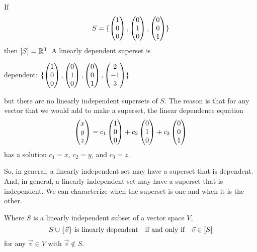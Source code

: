 \begin{example}
If
\begin{equation*}
   S =\mbox{$\{\begin{pmatrix} 1 \\ 0 \\ 0 \end{pmatrix},
          \begin{pmatrix} 0 \\ 1 \\ 0 \end{pmatrix},
          \begin{pmatrix} 0 \\ 0 \\ 1 \end{pmatrix}        \}$} 
\end{equation*}
then \( \relax [S\relax ]=\mathbb{R}^3 \).
A linearly dependent superset is 
\begin{center}
     dependent:
     \( \mbox{$\{
         \begin{pmatrix} 1 \\ 0 \\ 0 \end{pmatrix},
         \begin{pmatrix} 0 \\ 1 \\ 0 \end{pmatrix},
         \begin{pmatrix} 0 \\ 0 \\ 1 \end{pmatrix},
         \begin{pmatrix} 2 \\ -1 \\ 3 \end{pmatrix} \}$} \)     
\end{center}
but there are no linearly independent supersets of $S$.
The reason is that for any vector that we would add to make a
superset, the linear dependence equation
\begin{equation*}
  \begin{pmatrix} x \\ y \\ z \end{pmatrix}
  =c_1\begin{pmatrix} 1 \\ 0 \\ 0 \end{pmatrix}
   +c_2\begin{pmatrix} 0 \\ 1 \\ 0 \end{pmatrix}
   +c_3\begin{pmatrix} 0 \\ 0 \\ 1 \end{pmatrix}
\end{equation*}
has a solution $c_1=x$, $c_2=y$, and $c_3=z$.
\end{example}

So, in general, a linearly independent set 
may have a superset that is dependent.
And, in general, a  
linearly independent set may  have a superset that is independent.
We can characterize when the superset is one and when it is the other.

\begin{lemma} \label{le:SUnionXiLIIffXiNotInSpan}
Where \( S \) is a linearly independent subset of a vector space \( V \),
\begin{equation*}
  S\cup\mbox{$\{\vec{v}\}$}\text{\ is linearly dependent}
  \quad\text{if and only if}\quad
  \vec{v}\in\relax [S\relax ]
\end{equation*}
for any \( \vec{v}\in V \) with \( \vec{v}\not\in S \).
\end{lemma}


